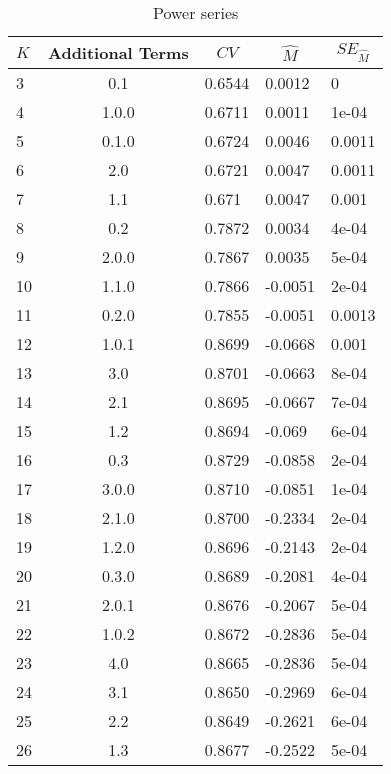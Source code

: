 
\begin{table}[H]
\centering
\caption{Power series}
\label{tab:ps}
\begin{tabular}{lclll}
  \hline
$K$ & Additional Terms & \multicolumn{1}{c}{$CV$} & \multicolumn{1}{c}{$\hat{M}$} & \multicolumn{1}{c}{$SE_{\hat{M}}$} \\ 
  \hline
  3 & 0.1 & 0.6544 & 0.0012 & 0 \\ 
  4 & 1.0.0 & 0.6711 & 0.0011 & 1e-04 \\ 
  5 & 0.1.0 & 0.6724 & 0.0046 & 0.0011 \\ 
  6 & 2.0 & 0.6721 & 0.0047 & 0.0011 \\ 
  7 & 1.1 & 0.671 & 0.0047 & 0.001 \\ 
  8 & 0.2 & 0.7872 & 0.0034 & 4e-04 \\ 
  9 & 2.0.0 & 0.7867 & 0.0035 & 5e-04 \\ 
  10 & 1.1.0 & 0.7866 & -0.0051 & 2e-04 \\ 
  11 & 0.2.0 & 0.7855 & -0.0051 & 0.0013 \\ 
  12 & 1.0.1 & 0.8699 & -0.0668 & 0.001 \\ 
  13 & 3.0 & 0.8701 & -0.0663 & 8e-04 \\ 
  14 & 2.1 & 0.8695 & -0.0667 & 7e-04 \\ 
  15 & 1.2 & 0.8694 & -0.069 & 6e-04 \\ 
  16 & 0.3 & 0.8729 & -0.0858 & 2e-04 \\ 
  17 & 3.0.0 & 0.8710 & -0.0851 & 1e-04 \\ 
  18 & 2.1.0 & 0.8700 & -0.2334 & 2e-04 \\ 
  19 & 1.2.0 & 0.8696 & -0.2143 & 2e-04 \\ 
  20 & 0.3.0 & 0.8689 & -0.2081 & 4e-04 \\ 
  21 & 2.0.1 & 0.8676 & -0.2067 & 5e-04 \\ 
  22 & 1.0.2 & 0.8672 & -0.2836 & 5e-04 \\ 
  23 & 4.0 & 0.8665 & -0.2836 & 5e-04 \\ 
  24 & 3.1 & 0.8650 & -0.2969 & 6e-04 \\ 
  25 & 2.2 & 0.8649 & -0.2621 & 6e-04 \\ 
  26 & 1.3 & 0.8677 & -0.2522 & 5e-04 \\ 
   \hline
\end{tabular}
\end{table}
